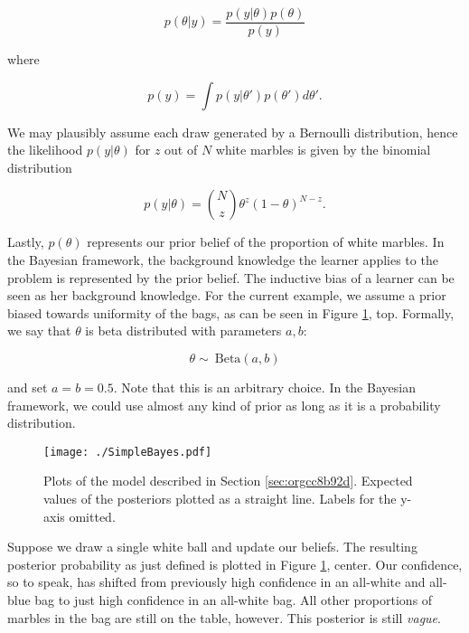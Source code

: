 \documentclass[11pt, a4paper]{article}
\begin{document}
\begin{equation}
  p(\theta|y) = \frac{p(y|\theta) p(\theta)}{p(y)}
\end{equation}

where

\begin{equation}
  p(y) = \int p(y|\theta')p(\theta')d\theta'.
\end{equation}

We may plausibly assume each draw generated by a Bernoulli distribution, hence
the likelihood \(p(y|\theta)\) for \(z\) out of \(N\) white marbles is given by the binomial distribution

\begin{equation}
  p(y|\theta) =\binom{N}{z} \theta^z (1-\theta)^{N-z}.
\end{equation}

Lastly, \(p(\theta)\) represents our prior belief of the proportion of white
marbles. In the Bayesian framework, the background knowledge the learner applies
to the problem is represented by the prior belief. The inductive bias of a
learner can be seen as her background knowledge. For the current example, we assume a
prior biased towards uniformity of the bags, as can be seen in Figure
\ref{fig:org759eaed}, top. Formally, we say that \(\theta\) is beta distributed
with parameters \(a,b\):

\begin{equation}
  \theta \sim ~ \text{Beta}(a,b)
\end{equation} 

and set \(a=b=0.5\). Note that this is an arbitrary choice. In the Bayesian
framework, we could use almost any kind of prior as long as it is a probability
distribution.

\begin{figure}[htbp]
  \centering \texttt{[image: ./SimpleBayes.pdf]}
  \caption{\label{fig:org759eaed} Plots of the model described in Section
    \ref{sec:orgcc8b92d}. Expected values of the posteriors plotted as a
    straight line. Labels for the y-axis omitted.}
\end{figure}

Suppose we draw a single white ball and update our beliefs. The resulting
posterior probability as just defined is plotted in Figure \ref{fig:org759eaed},
center. Our confidence, so to speak, has
shifted from previously high confidence in an all-white and all-blue bag to just
high confidence in an all-white bag. All other proportions of marbles in the bag
are still on the table, however. This posterior is still \emph{vague}.
\end{document}
